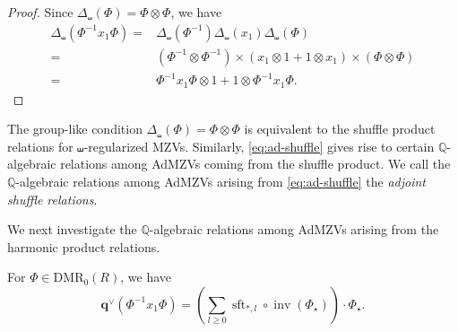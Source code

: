 \documentclass[15pt,oneside,reqno]{amsart}
\theoremstyle{remark}{
\newtheorem{lem}[df]{Lemma}
\newtheorem{prop}[df]{Proposition}
\newtheorem{ex}[df]{Example}
\newtheorem{rmk}[df]{Remark}
}
\newcommand{\Q}{\mathbb{Q}}
\newcommand{\DMR}{\mathrm{DMR}}
\DeclareMathOperator{\inv}{inv}
\DeclareMathOperator{\sft}{sft}
\begin{document}
\begin{proof}

Since $\Delta_{\shuffle}(\Phi) = \Phi \otimes \Phi$, we have
\begin{align*}
\Delta_{\shuffle}(\Phi^{-1}x_1\Phi ) =& \Delta_{\shuffle}(\Phi^{-1})\Delta_{\shuffle}(x_1) \Delta_{\shuffle}(\Phi )  \\
=&(\Phi^{-1} \otimes \Phi^{-1} ) \times (x_1\otimes 1 + 1\otimes x_1) \times (\Phi \otimes \Phi ) \\
=& \Phi^{-1}x_1\Phi  \otimes 1 + 1\otimes \Phi^{-1}x_1\Phi.
\end{align*}
\end{proof}
The group-like condition $\Delta_{\shuffle}(\Phi)=\Phi\otimes\Phi$ is equivalent to the shuffle product relations for $\shuffle$-regularized MZVs.
Similarly, \eqref{eq:ad-shuffle} gives rise to certain $\Q$-algebraic relations among AdMZVs coming from the shuffle product.
We call the $\Q$-algebraic relations among AdMZVs arising from \eqref{eq:ad-shuffle} the \textit{adjoint shuffle relations}.

We next investigate the $\Q$-algebraic relations among AdMZVs arising from the harmonic product relations.

\begin{prop}\label{prop:ad-proj}
For  $\Phi \in \DMR_0(R)$, we have
\[
\mathbf{q}^{\vee}(\Phi^{-1}x_1 \Phi) = \left(\sum_{l\ge 0}  \sft_{*,l} \circ \inv (\Phi_{\star}) \right) \cdot \Phi_{\star}.
\]
\end{prop}
\end{document}
